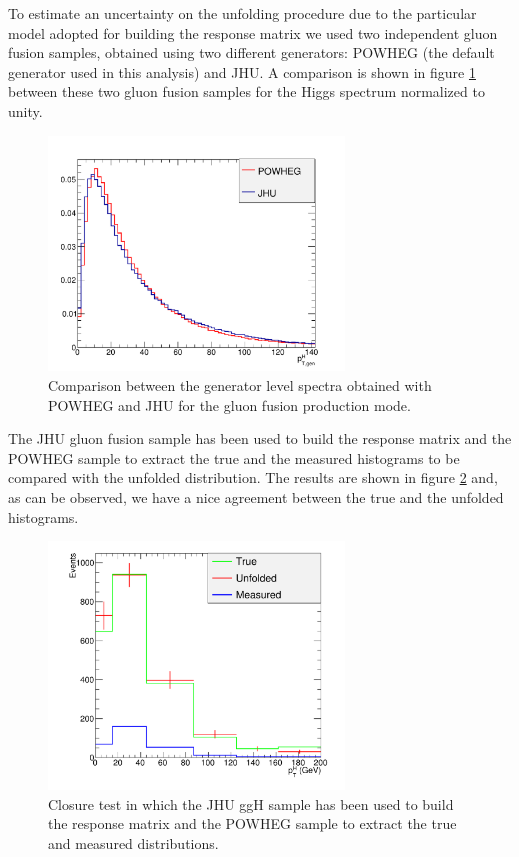 To estimate an uncertainty on the unfolding procedure due to the particular model adopted for building the response matrix we used two independent gluon fusion samples, obtained using two different generators: POWHEG (the default generator used in this analysis) and JHU. A comparison is shown in figure \ref{fig:jhu_powheg} between these two gluon fusion samples for the Higgs \pt spectrum normalized to unity.
\begin{figure}[htb]
\centering
\includegraphics[width=0.7\textwidth]{images/jhu_powheg.pdf}
\caption{Comparison between the generator level \pth spectra obtained with POWHEG and JHU for the gluon fusion production mode.}
\label{fig:jhu_powheg}
\end{figure}
The JHU gluon fusion sample has been used to build the response matrix and the POWHEG sample to extract the true and the measured histograms to be compared with the unfolded distribution. The results are shown in figure \ref{fig:jhu_powheg_unfold} and, as can be observed, we have a nice agreement between the true and the unfolded histograms.\\
\begin{figure}[htb]
\centering
\includegraphics[width=0.7\textwidth]{images/jhu_powheg_unfold.pdf}
\caption{Closure test in which the JHU ggH sample has been used to build the response matrix and the POWHEG sample to extract the true and measured distributions.}
\label{fig:jhu_powheg_unfold}
\end{figure}

